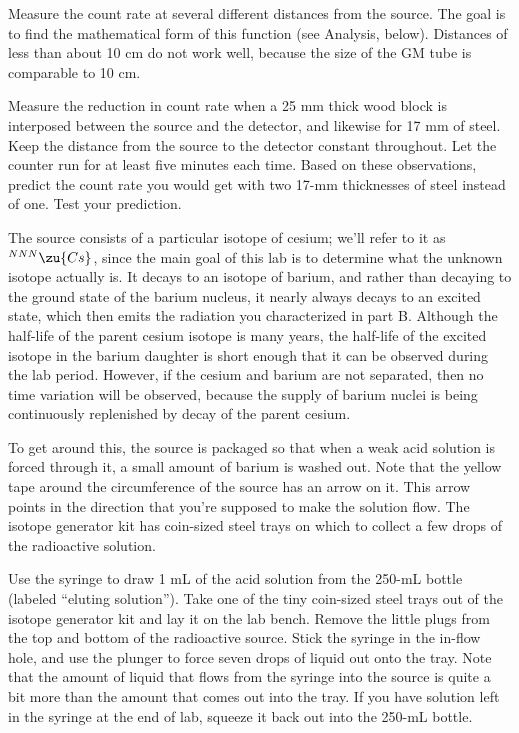 
Measure the count rate at several different distances from the source.
The goal is to find the mathematical form of this function (see Analysis, below).
Distances of less than about 10 cm do not work well, because the size of the GM tube
is comparable to 10 cm.


Measure the reduction in count rate when a 25 mm thick wood block is 
interposed between the source and the detector, and likewise for 17 mm of steel.
Keep the distance from the source to the detector constant throughout.
Let the counter run for at least five minutes each time.
Based on these observations, predict the count rate you would
get with two 17-mm thicknesses of steel instead of one. Test your prediction.


\newcommand{\ces}{$^{NNN}\zu{Cs}$}

The source consists of a particular isotope of cesium; we'll refer to it as \ces, since the main
goal of this lab is to determine what the unknown isotope actually is. It decays to an isotope
of barium, and rather than decaying to the ground state of the barium nucleus, it nearly always
decays to an excited state, which then emits the radiation you characterized in part B.
Although the half-life of the parent cesium isotope is many years, the half-life of the
excited isotope in the barium daughter is short enough that it can be observed during the lab
period. However, if the cesium and barium are not separated, then no time variation will
be observed, because the supply of barium nuclei is being continuously replenished by
decay of the parent cesium.


To get around this, the source is packaged so that when a weak acid solution is forced through
it, a small amount of barium is washed out. Note that the yellow tape around the circumference
of the source has an arrow on it. This arrow points in the direction that you're supposed
to make the solution flow. The isotope generator kit has coin-sized steel trays on which to
collect a few drops of the radioactive solution.

Use the syringe to draw 1 mL of the acid solution from the 250-mL bottle (labeled ``eluting solution'').
Take one of the tiny coin-sized steel trays out of the isotope generator kit and lay it on the lab bench.
Remove the little plugs from the top and bottom of the radioactive source. Stick the syringe in the
in-flow hole, and use the plunger to force seven drops of liquid out onto the tray. Note that
the amount of liquid that flows from the syringe into the source is quite a bit more than the
amount that comes out into the tray. If you have solution left in the syringe at the end of lab,
squeeze it back out into the 250-mL bottle.

